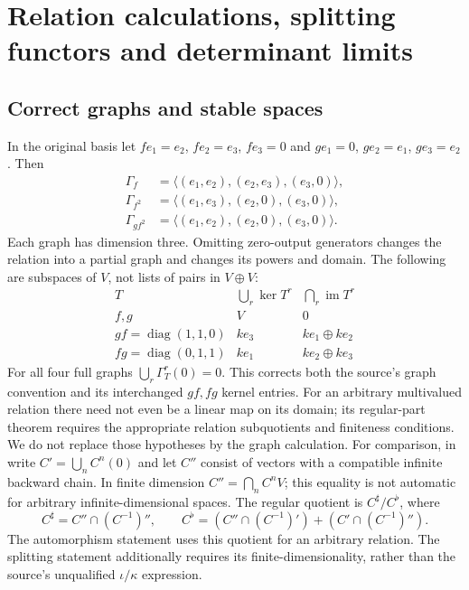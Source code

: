 \documentclass[11pt]{article}
\theoremstyle{definition}\newtheorem{definition}[theorem]{Definition}
\theoremstyle{remark}\newtheorem{remark}[theorem]{Remark}
\begin{document}
\section{Relation calculations, splitting functors and determinant limits}
\label{rel:details}
\subsection{Correct graphs and stable spaces}
In the original basis let $f e_1=e_2$, $f e_2=e_3$, $f e_3=0$ and
$g e_1=0$, $g e_2=e_1$, $g e_3=e_2$. Then
\[
\begin{split}
 \Gamma_f&=\langle(e_1,e_2),(e_2,e_3),(e_3,0)\rangle,\\
 \Gamma_{f^2}&=\langle(e_1,e_3),(e_2,0),(e_3,0)\rangle,\\
 \Gamma_{gf^2}&=\langle(e_1,e_2),(e_2,0),(e_3,0)\rangle.
\end{split}
\]
Each graph has dimension three. Omitting zero-output generators changes
the relation into a partial graph and changes its powers and domain.
The following are subspaces of $V$, not lists of pairs in $V\oplus V$:
\[
\begin{array}{c|cc}
T&\bigcup_r\ker T^r&\bigcap_r\operatorname{im}T^r\\\hline
f,g&V&0\\
gf=\operatorname{diag}(1,1,0)&ke_3&ke_1\oplus ke_2\\
fg=\operatorname{diag}(0,1,1)&ke_1&ke_2\oplus ke_3
\end{array}
\]
For all four full graphs $\bigcup_r\Gamma_T^r(0)=0$. This corrects both
the source's graph convention and its interchanged $gf,fg$ kernel entries.
For an arbitrary multivalued relation there need not even be a linear map
on its domain; its regular-part theorem requires the appropriate relation
subquotients and finiteness conditions. We do not replace those hypotheses
by the graph calculation.
For comparison, in \cite[Section 4, Lemmas 4.2,4.5--4.6]{CrawleyBoeveyStrings}
write $C'=\bigcup_n C^n(0)$ and let $C''$ consist of vectors with a
compatible infinite backward chain. In finite dimension $C''=\bigcap_n C^nV$;
this equality is not automatic for arbitrary infinite-dimensional spaces.
The regular quotient is $C^\sharp/C^\flat$, where
\[
 C^\sharp=C''\cap(C^{-1})'',\qquad
 C^\flat=(C''\cap(C^{-1})')+(C'\cap(C^{-1})'').
\]
The automorphism statement uses this quotient for an arbitrary relation.
The splitting statement additionally requires its finite-dimensionality,
rather than the source's unqualified $\iota/\kappa$ expression.
\end{document}
